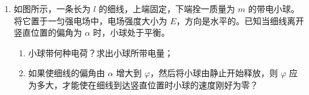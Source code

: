 \documentclass[\gkver]{gaokaozhenti}
\begin{document}
\begin{enumerate}
{当 $n=4$ 时，$v=6800\Ums$；

波速无法取 $6000\Ums$，故波不可能向右传播。

如果波向左传播，传播的最短距离为 $6\Um=\frac{3}{4}\lambda$，由波的周期性得 $6\Um=n\lambda+\frac{3}{4}\lambda$，则波速为
$v=\frac{n\lambda+\frac{3}{4}\lambda}{\Delta t}=\frac{8n+6}{0.005}\Ums=1600n+1200\Ums$，$n$ 取自然数。

当 $n=3$ 时，$v=6000\Ums$，波速可取得 $6000\Ums$，故波向左传播。

评分标准：全题 7 分。（1）2 分，（2）4 分，（3）1 分。（1）中，振幅和波长各占 1 分。（2）中，两个传播速度各占 2 分。（3）中，只有最后答案而无算式或解释说明的，不给分。
}

\item
如图所示，一条长为 $l$ 的细线，上端固定，下端拴一质量为 $m$ 的带电小球。将它置于一匀强电场中，电场强度大小为 $E$，方向是水平的。已知当细线离开竖直位置的偏角为 $\alpha$ 时，小球处于平衡。
\begin{enumerate}
	\item
	小球带何种电荷？求出小球所带电量；
	\item
	如果使细线的偏角由 $\alpha$ 增大到 $\varphi$，然后将小球由静止开始释放，则 $\varphi$ 应为多大，才能使在细线到达竖直位置时小球的速度刚好为零？
\end{enumerate}
\onepicture[align=right, w=4.5cm]{}

{}

\end{enumerate}
\end{document}
